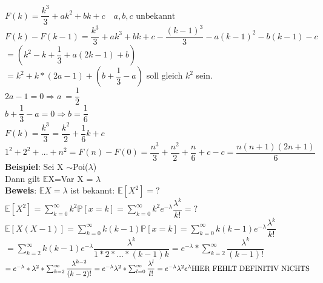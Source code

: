 $F(k) = \dfrac{k^3}{3}+ak^2+bk+c \quad a,b,c \text{ unbekannt}$\smallskip\\
$F(k)-F(k-1) = \dfrac{k^3}{3}+ak^3+bk+c-\dfrac{(k-1)^3}{3}-a(k-1)^2-b(k-1)-c$\smallskip\\
$=(k^2-k+\dfrac{1}{3}+a(2k-1)+b)$\smallskip\\
$=k^2+k*(2a-1)+(b+\dfrac{1}{3}-a)$ soll gleich $k^2$ sein.\smallskip\\
$2a-1 = 0 \Rightarrow a\ = \dfrac{1}{2}$\smallskip\\
$b+\dfrac{1}{3}-a=0 \Rightarrow b = \dfrac{1}{6}$\smallskip\\
$F(k) = \dfrac{k^3}{3} = \dfrac{k^2}{2}+\dfrac{1}{6}k+c$\medskip\\
$1^2+2^2+\dots+n^2=F(n)-F(0)=\dfrac{n^3}{3}+\dfrac{n^2}{2}+\dfrac{n}{6}+c-c = \dfrac{n(n+1)(2n+1)}{6}$\medskip\\
\textbf{Beispiel}: Sei X $\sim$Poi($\lambda$)\\
Dann gilt $\mathds{E}$X=Var X = $\lambda$\medskip\\
\textbf{Beweis}: $\mathds{E}X=\lambda $ ist bekannt: \hspace{1cm} $\mathds{E}[X^2]=?$\smallskip\\
$\mathds{E}[X^2]=\sum_{k=0}^\infty k^2\mathds{P}[x=k]=\sum_{k=0}^\infty k^2e^{-\lambda} \dfrac{\lambda^k}{k!}=? $\medskip\\
$\mathds{E}[X(X-1)] = \sum_{k=0}^\infty k(k-1)\mathds{P}[x=k] = \sum_{k=0}^\infty k(k-1)e^{-\lambda} \dfrac{\lambda^k}{k!}$\medskip\\
$=\sum_{k=2}^\infty k(k-1)e^{-\lambda}\dfrac{\lambda^k}{1*2*\dots*(k-1)k}=e^{-\lambda}* \sum_{k=2}^\infty\dfrac{\lambda^k}{(k-1)!}$\smallskip\\
\begin{math}
=e^{-\lambda}*\lambda^2*\sum_{k=2}^\infty \dfrac{\lambda^{k-2}}{(k-2)!}\smallskip\\
=e^{-\lambda} \lambda^2 * \sum_{l=0}^{\infty}\dfrac{\lambda^l}{l!}=e^{-\lambda}\lambda^2e^\lambda \medskip\\
\text{HIER FEHLT DEFINITIV NICHTS}
\end{math}